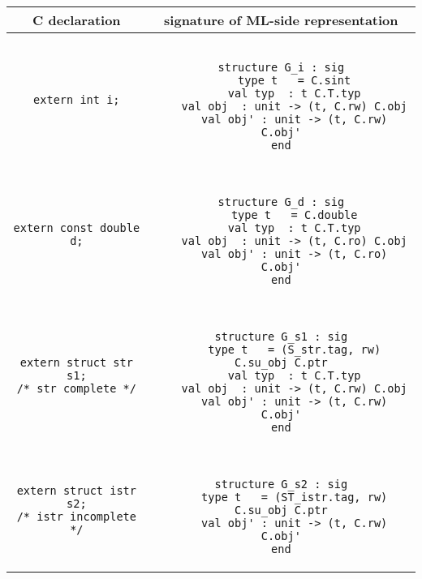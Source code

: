 \documentclass[titlepage,letterpaper]{article}
\begin{document}
\begin{center}
\begin{tabular}{c|c}
C declaration & signature of ML-side representation \\ \hline\hline
{\tt extern int i;}
&
\begin{minipage}{4in}
\begin{verbatim}

structure G_i : sig
    type t   = C.sint
    val typ  : t C.T.typ
    val obj  : unit -> (t, C.rw) C.obj
    val obj' : unit -> (t, C.rw) C.obj'
end

\end{verbatim}
\end{minipage}
\\ \hline
{\tt extern const double d;}
&
\begin{minipage}{4in}
\begin{verbatim}

structure G_d : sig
    type t   = C.double
    val typ  : t C.T.typ
    val obj  : unit -> (t, C.ro) C.obj
    val obj' : unit -> (t, C.ro) C.obj'
end

\end{verbatim}
\end{minipage}
\\ \hline
\begin{minipage}{2in}
\begin{verbatim}
extern struct str s1;
/* str complete */
\end{verbatim}
\end{minipage}
&
\begin{minipage}{4in}
\begin{verbatim}

structure G_s1 : sig
    type t   = (S_str.tag, rw) C.su_obj C.ptr
    val typ  : t C.T.typ
    val obj  : unit -> (t, C.rw) C.obj
    val obj' : unit -> (t, C.rw) C.obj'
end

\end{verbatim}
\end{minipage}
\\ \hline
\begin{minipage}{2in}
\begin{verbatim}
extern struct istr s2;
/* istr incomplete */
\end{verbatim}
\end{minipage}
&
\begin{minipage}{4in}
\begin{verbatim}

structure G_s2 : sig
    type t   = (ST_istr.tag, rw) C.su_obj C.ptr
    val obj' : unit -> (t, C.rw) C.obj'
end

\end{verbatim}
\end{minipage}
\end{tabular}
\end{center}
\end{document}
